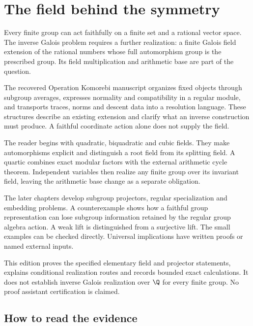 \chapter*{The field behind the symmetry}

Every finite group can act faithfully on a finite set and a rational vector space. The inverse Galois problem requires a further realization: a finite Galois field extension of the rational numbers whose full automorphism group is the prescribed group. Its field multiplication and arithmetic base are part of the question.

The recovered Operation Komorebi manuscript organizes fixed objects through subgroup averages, expresses normality and compatibility in a regular module, and transports traces, norms and descent data into a resolution language. These structures describe an existing extension and clarify what an inverse construction must produce. A faithful coordinate action alone does not supply the field.

The reader begins with quadratic, biquadratic and cubic fields. They make automorphisms explicit and distinguish a root field from its splitting field. A quartic combines exact modular factors with the external arithmetic cycle theorem. Independent variables then realize any finite group over its invariant field, leaving the arithmetic base change as a separate obligation.

The later chapters develop subgroup projectors, regular specialization and embedding problems. A counterexample shows how a faithful group representation can lose subgroup information retained by the regular group algebra action. A weak lift is distinguished from a surjective lift. The small examples can be checked directly. Universal implications have written proofs or named external inputs.

\begin{claimboundary}
This edition proves the specified elementary field and projector statements, explains conditional realization routes and records bounded exact calculations. It does not establish inverse Galois realization over $\Q$ for every finite group. No proof assistant certification is claimed.
\end{claimboundary}

\section*{How to read the evidence}

